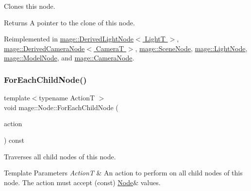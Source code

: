 Clones this node.

\begin{DoxyReturn}{Returns}
A pointer to the clone of this node. 
\end{DoxyReturn}


Reimplemented in \hyperlink{classmage_1_1_derived_light_node_acf8858989780bf45a45c55a7c5564314}{mage\+::\+Derived\+Light\+Node$<$ Light\+T $>$}, \hyperlink{classmage_1_1_derived_camera_node_aa965751029ebd6b41d3805b499a8304e}{mage\+::\+Derived\+Camera\+Node$<$ Camera\+T $>$}, \hyperlink{classmage_1_1_scene_node_a42d0d53ab804d38ebd584d2de6490eeb}{mage\+::\+Scene\+Node}, \hyperlink{classmage_1_1_light_node_aea97601d0a4b8073a1c655ca334af242}{mage\+::\+Light\+Node}, \hyperlink{classmage_1_1_model_node_a34146201083015276b38240af307417f}{mage\+::\+Model\+Node}, and \hyperlink{classmage_1_1_camera_node_a002d3a2b41cda270a26ca5d8f3a17f55}{mage\+::\+Camera\+Node}.

\hypertarget{classmage_1_1_node_afedb523a462952ec29aed7504d0a71d4}{}\label{classmage_1_1_node_afedb523a462952ec29aed7504d0a71d4} 
\subsubsection{\texorpdfstring{For\+Each\+Child\+Node()}{ForEachChildNode()}}
{\footnotesize\ttfamily template$<$typename ActionT $>$ \\
void mage\+::\+Node\+::\+For\+Each\+Child\+Node (\begin{DoxyParamCaption}\item[{ActionT}]{action }\end{DoxyParamCaption}) const}

Traverses all child nodes of this node.


\begin{DoxyTemplParams}{Template Parameters}
{\em ActionT} & An action to perform on all child nodes of this node. The action must accept ({\ttfamily const}) {\ttfamily \hyperlink{classmage_1_1_node}{Node}\&} values. \\
\hline
\end{DoxyTemplParams}
\hypertarget{classmage_1_1_node_a86668c371e1452204b52f2896cbb16fd}{}\label{classmage_1_1_node_a86668c371e1452204b52f2896cbb16fd} 
